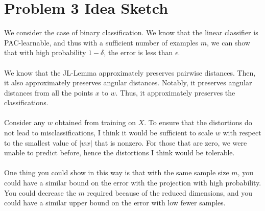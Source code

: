 \documentclass[a4paper,13pt]{article}
\begin{document}
\section*{Problem 3 Idea Sketch}
We consider the case of binary classification. We know that the linear classifier is PAC-learnable, and thus with a sufficient number of examples $m$, we can show that with high probability $1 - \delta$, the error is less than $\epsilon$. 
\\\\
We know that the JL-Lemma approximately preserves pairwise distances. Then, it also approximately preserves angular distances. Notably, it preserves angular distances from all the points $x$ to $w$. Thus, it approximately preserves the classifications.
\\\\
Consider any $w$ obtained from training on $X$. To ensure that the distortions do not lead to misclassifications, I think it would be sufficient to scale $w$ with respect to the smallest value of $\left| wx \right|$ that is nonzero. For those that are zero, we were unable to predict before, hence the distortions I think would be tolerable.
\\\\
One thing you could show in this way is that with the same sample size $m$, you could have a similar bound on the error with the projection with high probability. You could decrease the $m$ required because of the reduced dimensions, and you could have a similar upper bound on the error with low fewer samples. 



\end{document}
